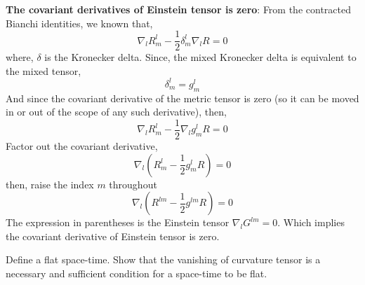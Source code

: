 \documentclass[../main-sheet.tex]{subfiles}
\begin{document}
\begin{soln}
            \textbf{The covariant derivatives of Einstein tensor is zero}: From the contracted Bianchi identities, we known that,
            \[\nabla_l R_m^l-\frac{1}{2}\delta_m^l\nabla_l R=0\]
            where, \(\delta\) is the Kronecker delta. Since, the mixed Kronecker delta is equivalent to the mixed tensor,
            \[\delta_m^l=g_m^l\]
            And since the covariant derivative of the metric tensor is zero (so it can be moved in or out of the scope of any such derivative), then,
            \[\nabla_l R_m^l-\frac{1}{2}\nabla_l g_m^l R=0\]
            Factor out the covariant derivative,
            \[\nabla_l \left(R_m^l-\frac{1}{2} g_m^l R\right)=0\]
            then, raise the index \(m\) throughout
            \[\nabla_l \left(R^{lm}-\frac{1}{2} g^{lm} R\right)=0\]
            The expression in parentheses is the Einstein tensor \(\nabla_l G^{lm}=0\). Which implies the covariant derivative of Einstein tensor is zero.
        \end{soln}
        \begin{prob}[7]
            Define a flat space-time. Show that the vanishing of curvature tensor is a necessary and sufficient condition for a space-time to be flat.
        \end{prob}
\end{document}

